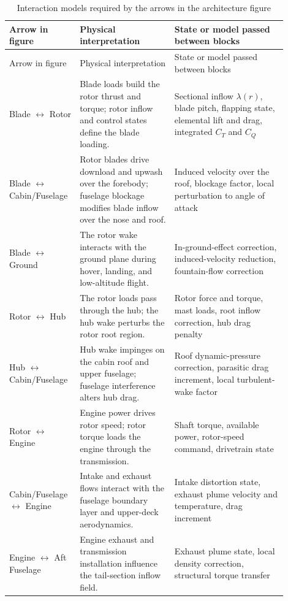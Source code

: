 \documentclass[12pt,a4paper]{article}
\begin{document}
\begin{longtable}{p{0.20\linewidth} p{0.32\linewidth} p{0.38\linewidth}}
\caption{Interaction models required by the arrows in the architecture figure}
\label{tab:interactions} \\
\toprule
Arrow in figure & Physical interpretation & State or model passed between blocks \\
\midrule
\endfirsthead
\toprule
Arrow in figure & Physical interpretation & State or model passed between blocks \\
\midrule
\endhead
Blade $\leftrightarrow$ Rotor & Blade loads build the rotor thrust and torque; rotor inflow and control states define the blade loading. & Sectional inflow $\lambda(r)$, blade pitch, flapping state, elemental lift and drag, integrated $C_T$ and $C_Q$ \\
Blade $\leftrightarrow$ Cabin/Fuselage & Rotor blades drive download and upwash over the forebody; fuselage blockage modifies blade inflow over the nose and roof. & Induced velocity over the roof, blockage factor, local perturbation to angle of attack \\
Blade $\leftrightarrow$ Ground & The rotor wake interacts with the ground plane during hover, landing, and low-altitude flight. & In-ground-effect correction, induced-velocity reduction, fountain-flow correction \\
Rotor $\leftrightarrow$ Hub & The rotor loads pass through the hub; the hub wake perturbs the rotor root region. & Rotor force and torque, mast loads, root inflow correction, hub drag penalty \\
Hub $\leftrightarrow$ Cabin/Fuselage & Hub wake impinges on the cabin roof and upper fuselage; fuselage interference alters hub drag. & Roof dynamic-pressure correction, parasitic drag increment, local turbulent-wake factor \\
Rotor $\leftrightarrow$ Engine & Engine power drives rotor speed; rotor torque loads the engine through the transmission. & Shaft torque, available power, rotor-speed command, drivetrain state \\
Cabin/Fuselage $\leftrightarrow$ Engine & Intake and exhaust flows interact with the fuselage boundary layer and upper-deck aerodynamics. & Intake distortion state, exhaust plume velocity and temperature, drag increment \\
Engine $\leftrightarrow$ Aft Fuselage & Engine exhaust and transmission installation influence the tail-section inflow field. & Exhaust plume state, local density correction, structural torque transfer \\

\end{longtable}
\end{document}
